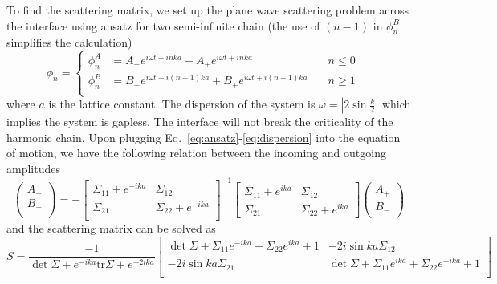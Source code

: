 To find the scattering matrix, we set up the plane wave scattering problem across the interface using ansatz for two semi-infinite chain (the use of $(n-1)$ in $\phi_n^B$ simplifies the calculation)
\begin{equation}
\label{eq:ansatz}
\phi_n
= \left\lbrace
  \begin{aligned}
    \phi_n^A &= A_{-} e^{i \omega t  - inka}  + A_{+} e^{i \omega t  + inka}  & \quad  n \le 0 \\
    \phi_n^B &= B_{-} e^{i \omega t  - i(n-1)ka}  + B_{+} e^{i \omega t  + i(n-1)ka} & \quad n \ge 1 \\
  \end{aligned} \right. 
 \quad 
\end{equation}
where $a$ is the lattice constant. The dispersion of the system is $\omega = \left|2\sin\frac{k}{2}\right|$ which implies the system is gapless. The interface will not break the criticality of the harmonic chain\cite{peschel_exact_2012}. Upon plugging Eq.~\eqref{eq:ansatz}-\eqref{eq:dispersion} into the equation of motion, we have the following relation between the incoming and outgoing amplitudes
\begin{equation}
\label{eq:discrete_S}
\begin{pmatrix}
A_{-} \\
B_{+}\\
\end{pmatrix}
=-
\begin{bmatrix}
\Sigma_{11} + e^{-ika} & \Sigma_{12} \\
\Sigma_{21} & \Sigma_{22}  + e^{-ika}  \\
\end{bmatrix}^{-1}
\begin{bmatrix}
\Sigma_{11} +e^{ika} & \Sigma_{12}\\
\Sigma_{21} & \Sigma_{22} + e^{ika}
\end{bmatrix}
\begin{pmatrix}
A_{+}\\
B_{-}\\
\end{pmatrix}
\end{equation}
and the scattering matrix can be solved as
\begin{equation}
  S = \frac{-1}{ \det \Sigma  + e^{-ika} \text{tr} \Sigma   + e^{-2ika}}
\begin{bmatrix}
\det \Sigma+ \Sigma_{11} e^{-ika} + \Sigma_{22} e^{ika}+1  & -2i \sin ka \Sigma_{12}  \\
-2i \sin ka \Sigma_{21} &  \det \Sigma+ \Sigma_{11} e^{ika} + \Sigma_{22} e^{-ika}+1\\
\end{bmatrix}
\end{equation}
